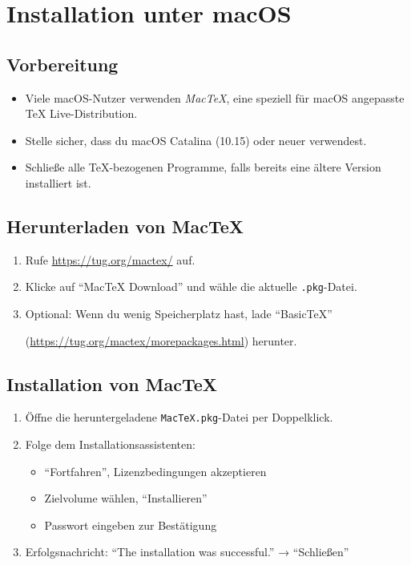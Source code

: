 \section{Installation unter macOS}
\subsection{Vorbereitung}
\begin{itemize}
    \item Viele macOS-Nutzer verwenden \emph{Mac\TeX}, eine speziell für macOS angepasste TeX Live-Distribution.
    \item Stelle sicher, dass du macOS Catalina (10.15) oder neuer verwendest.
    \item Schließe alle \TeX-bezogenen Programme, falls bereits eine ältere Version installiert ist.
\end{itemize}

\subsection{Herunterladen von Mac\TeX}
\begin{enumerate}
    \item Rufe \mbox{\url{https://tug.org/mactex/}} auf.
    \item Klicke auf \enquote{MacTeX Download} und wähle die aktuelle \texttt{.pkg}-Datei.
    \item Optional: Wenn du wenig Speicherplatz hast, lade \enquote{BasicTeX} 
    
    (\mbox{\url{https://tug.org/mactex/morepackages.html}}) herunter.
\end{enumerate}

\subsection{Installation von Mac\TeX}
\begin{enumerate}
    \item Öffne die heruntergeladene \texttt{MacTeX.pkg}-Datei per Doppelklick.
    \item Folge dem Installationsassistenten:
    \begin{itemize}
        \item \enquote{Fortfahren}, Lizenzbedingungen akzeptieren
        \item Zielvolume wählen, \enquote{Installieren}
        \item Passwort eingeben zur Bestätigung
    \end{itemize}
    \item Erfolgsnachricht: \enquote{The installation was successful.} → \enquote{Schließen}
\end{enumerate}

